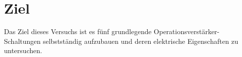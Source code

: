 \section{Ziel}
\label{sec:ziel}

Das Ziel dieses Versuchs ist es fünf grundlegende Operationsverstärker-Schaltungen selbstständig aufzubauen und deren elektrische Eigenschaften zu untersuchen.